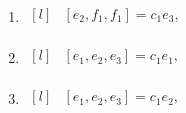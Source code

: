 \begin{adjustwidth*}{-0.5cm}{0cm}
\begin{multicols*}{2}
\begin{enumerate}
    \item $\begin{matrix*}[l]
            & [e_2, f_1, f_1] =  c_{1} e_3, \\
        \end{matrix*}$

    \item $\begin{matrix*}[l]
            & [e_1, e_2, e_3] = c_{1} e_1  , \\
        \end{matrix*}$

    \item $\begin{matrix*}[l]
            & [e_1, e_2, e_3] =  c_{1} e_2 , \\
        \end{matrix*}$
\end{enumerate}
\end{multicols*}
\end{adjustwidth*}
